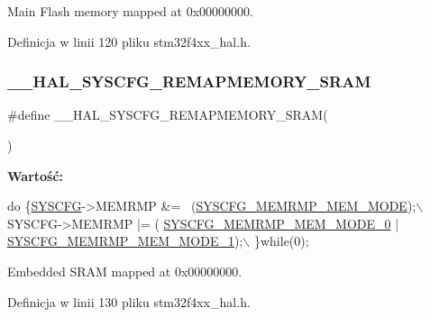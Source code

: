 Main Flash memory mapped at 0x00000000. 



Definicja w linii 120 pliku stm32f4xx\+\_\+hal.\+h.

\mbox{\label{group___h_a_l___exported___macros_ga86d36fdb1571fd56ffeecfaed80c6805}} 
\subsubsection{\texorpdfstring{\+\_\+\+\_\+\+H\+A\+L\+\_\+\+S\+Y\+S\+C\+F\+G\+\_\+\+R\+E\+M\+A\+P\+M\+E\+M\+O\+R\+Y\+\_\+\+S\+R\+AM}{\_\_HAL\_SYSCFG\_REMAPMEMORY\_SRAM}}
{\footnotesize\ttfamily \#define \+\_\+\+\_\+\+H\+A\+L\+\_\+\+S\+Y\+S\+C\+F\+G\+\_\+\+R\+E\+M\+A\+P\+M\+E\+M\+O\+R\+Y\+\_\+\+S\+R\+AM(\begin{DoxyParamCaption}{ }\end{DoxyParamCaption})}

{\bfseries Wartość\+:}
\begin{DoxyCode}
\textcolor{keywordflow}{do} \{\hyperlink{group___peripheral__declaration_ga3c833fe1c486cb62250ccbca32899cb8}{SYSCFG}->MEMRMP &= ~(\hyperlink{group___peripheral___registers___bits___definition_ga3c05039ec67573c00da29f58b914f258}{SYSCFG\_MEMRMP\_MEM\_MODE});\(\backslash\)
                                                  SYSCFG->MEMRMP |= (
      \hyperlink{group___peripheral___registers___bits___definition_ga30d5f406535f94faea2e7f924d50201b}{SYSCFG\_MEMRMP\_MEM\_MODE\_0} | \hyperlink{group___peripheral___registers___bits___definition_gab5d76e8b4d801b35c31ef352b33407be}{SYSCFG\_MEMRMP\_MEM\_MODE\_1});\(\backslash\)
                                                 \}\textcolor{keywordflow}{while}(0);
\end{DoxyCode}


Embedded S\+R\+AM mapped at 0x00000000. 



Definicja w linii 130 pliku stm32f4xx\+\_\+hal.\+h.


